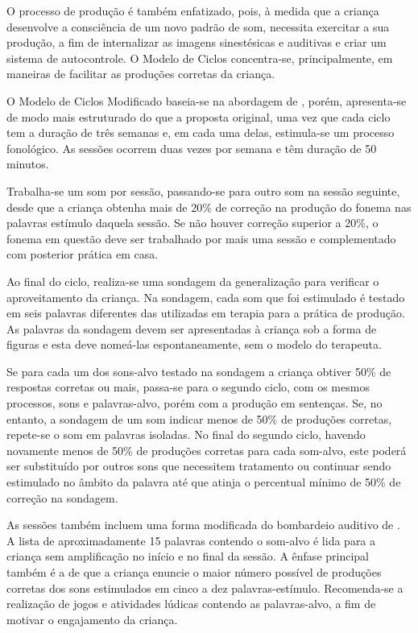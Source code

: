 \documentclass[output=paper,colorlinks,citecolor=brown,booklanguage=portuguese]{langscibook}
\begin{document}
O processo de produção é também enfatizado, pois, à medida que a criança desenvolve a consciência de um novo padrão de som, necessita exercitar a sua produção, a fim de internalizar as imagens sinestésicas e auditivas e criar um sistema de autocontrole. O Modelo de Ciclos concentra-se, principalmente, em maneiras de facilitar as produções corretas da criança. 

O Modelo de Ciclos Modificado \citep{Tyler1987} baseia-se na abordagem de \citet{Hodson1983}, porém, apresenta-se de modo mais estruturado do que a proposta original, uma vez que cada ciclo tem a duração de três semanas e, em cada uma delas, estimula-se um processo fonológico. As sessões ocorrem duas vezes por semana e têm duração de 50 minutos.

Trabalha-se um som por sessão, passando-se para outro som na sessão seguinte, desde que a criança obtenha mais de 20\% de correção na produção do fonema nas palavras estímulo daquela sessão. Se não houver correção superior a 20\%, o fonema em questão deve ser trabalhado por mais uma sessão e complementado com posterior prática em casa.

Ao final do ciclo, realiza-se uma sondagem da generalização para verificar o aproveitamento da criança. Na sondagem, cada som que foi estimulado é testado em seis palavras diferentes das utilizadas em terapia para a prática de produção. As palavras da sondagem devem ser apresentadas à criança sob a forma de figuras e esta deve nomeá-las espontaneamente, sem o modelo do terapeuta.

Se para cada um dos sons-alvo testado na sondagem a criança obtiver 50\% de respostas corretas ou mais, passa-se para o segundo ciclo, com os mesmos processos, sons e palavras-alvo, porém com a produção em sentenças. Se, no entanto, a sondagem de um som indicar menos de 50\% de produções corretas, repete-se o som em palavras isoladas. No final do segundo ciclo, havendo novamente menos de 50\% de produções corretas para cada som-alvo, este poderá ser substituído por outros sons que necessitem tratamento ou continuar sendo estimulado no âmbito da palavra até que atinja o percentual mínimo de 50\% de correção na sondagem.

As sessões também incluem uma forma modificada do bombardeio auditivo de \citet{Hodson1983}. A lista de aproximadamente 15 palavras contendo o som-alvo é lida para a criança sem amplificação no início e no final da sessão. A ênfase principal também é a de que a criança enuncie o maior número possível de produções corretas dos sons estimulados em cinco a dez palavras-estímulo. Recomenda-se a realização de jogos e atividades lúdicas contendo as palavras-al\-vo, a fim de motivar o engajamento da criança.
\end{document}
